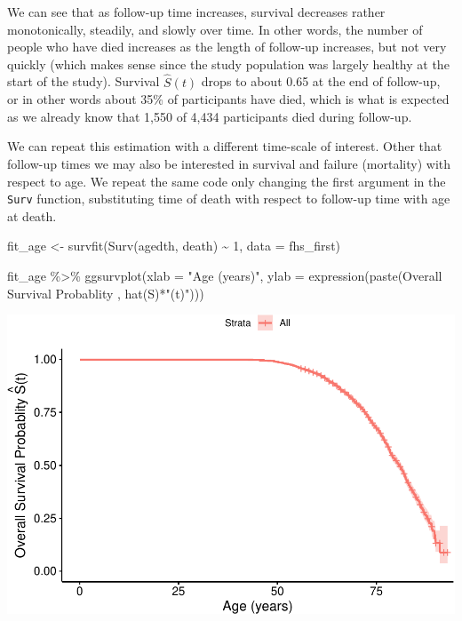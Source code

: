 \documentclass[
]{book}
\newenvironment{Shaded}{\begin{snugshade}}{\end{snugshade}}
\newcommand{\AttributeTok}[1]{\textcolor[rgb]{0.77,0.63,0.00}{#1}}
\newcommand{\DecValTok}[1]{\textcolor[rgb]{0.00,0.00,0.81}{#1}}
\newcommand{\FunctionTok}[1]{\textcolor[rgb]{0.00,0.00,0.00}{#1}}
\newcommand{\NormalTok}[1]{#1}
\newcommand{\OtherTok}[1]{\textcolor[rgb]{0.56,0.35,0.01}{#1}}
\newcommand{\SpecialCharTok}[1]{\textcolor[rgb]{0.00,0.00,0.00}{#1}}
\newcommand{\StringTok}[1]{\textcolor[rgb]{0.31,0.60,0.02}{#1}}
\begin{document}
We can see that as follow-up time increases, survival decreases rather monotonically, steadily, and slowly over time. In other words, the number of people who have died increases as the length of follow-up increases, but not very quickly (which makes sense since the study population was largely healthy at the start of the study). Survival \(\hat{S}(t)\) drops to about 0.65 at the end of follow-up, or in other words about 35\% of participants have died, which is what is expected as we already know that 1,550 of 4,434 participants died during follow-up.

We can repeat this estimation with a different time-scale of interest. Other that follow-up times we may also be interested in survival and failure (mortality) with respect to age. We repeat the same code only changing the first argument in the \texttt{Surv} function, substituting time of death with respect to follow-up time with age at death.

\begin{Shaded}
\begin{Highlighting}[]
\NormalTok{fit\_age }\OtherTok{\textless{}{-}} \FunctionTok{survfit}\NormalTok{(}\FunctionTok{Surv}\NormalTok{(agedth, death) }\SpecialCharTok{\textasciitilde{}} \DecValTok{1}\NormalTok{, }\AttributeTok{data =}\NormalTok{ fhs\_first)}

\NormalTok{fit\_age }\SpecialCharTok{\%\textgreater{}\%}
  \FunctionTok{ggsurvplot}\NormalTok{(}\AttributeTok{xlab =} \StringTok{"Age (years)"}\NormalTok{,}
             \AttributeTok{ylab =} \FunctionTok{expression}\NormalTok{(}\FunctionTok{paste}\NormalTok{(}\StringTok{\textquotesingle{}Overall Survival Probablity \textquotesingle{}}\NormalTok{,}
                                     \FunctionTok{hat}\NormalTok{(S)}\SpecialCharTok{*}\StringTok{"(t)"}\NormalTok{)))}
\end{Highlighting}
\end{Shaded}

\includegraphics{adv_epi_analysis_files/figure-latex/unnamed-chunk-202-1.pdf}
\end{document}
